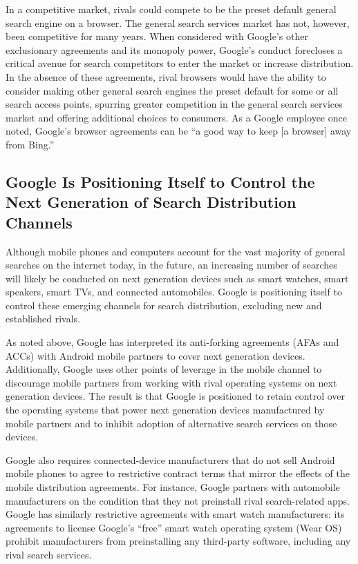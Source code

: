 \documentclass[11pt,b5paper,headings=small]{scrartcl}
\begin{document}

In a competitive market, rivals could compete to be the preset default general
search engine on a browser. The general search services market has not, however, been
competitive for many years. When considered with Google’s other exclusionary agreements and
its monopoly power, Google’s conduct forecloses a critical avenue for search competitors to
enter the market or increase distribution. In the absence of these agreements, rival browsers
would have the ability to consider making other general search engines the preset default for
some or all search access points, spurring greater competition in the general search services
market and offering additional choices to consumers. As a Google employee once noted,
Google’s browser agreements can be “a good way to keep [a browser] away from Bing.”

\subsection{Google Is Positioning Itself to Control the Next Generation of Search
Distribution Channels}


Although mobile phones and computers account for the vast majority of general
searches on the internet today, in the future, an increasing number of searches will likely be
conducted on next generation devices such as smart watches, smart speakers, smart TVs, and
connected automobiles. Google is positioning itself to control these emerging channels for search
distribution, excluding new and established rivals.


As noted above, Google has interpreted its anti-forking agreements (AFAs and
ACCs) with Android mobile partners to cover next generation devices. Additionally, Google
uses other points of leverage in the mobile channel to discourage mobile partners from working
with rival operating systems on next generation devices. The result is that Google is positioned to
retain control over the operating systems that power next generation devices manufactured by
mobile partners and to inhibit adoption of alternative search services on those devices.


Google also requires connected-device manufacturers that do not sell Android
mobile phones to agree to restrictive contract terms that mirror the effects of the mobile
distribution agreements. For instance, Google partners with automobile manufacturers on the
condition that they not preinstall rival search-related apps. Google has similarly restrictive
agreements with smart watch manufacturers: its agreements to license Google’s “free” smart
watch operating system (Wear OS) prohibit manufacturers from preinstalling any third-party
software, including any rival search services.
\end{document}
